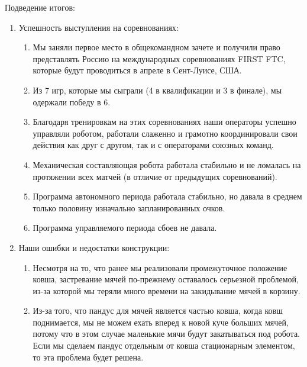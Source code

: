 Подведение итогов:
\begin{enumerate}
	\item Успешность выступления на соревнованиях:
	\begin{enumerate}
		\item Мы заняли первое место в общекомандном зачете и получили право представлять Россию на международных соревнованиях FIRST FTC, которые будут проводиться в апреле в Сент-Луисе, США.
		
		\item Из 7 игр, которые мы сыграли (4 в квалификации и 3 в финале), мы одержали победу в 6.
		
		\item Благодаря тренировкам на этих соревнованиях наши операторы успешно управляли роботом, работали слаженно и грамотно координировали свои действия как друг с другом, так и с операторами союзных команд.
		
		\item Механическая составляющая робота работала стабильно и не ломалась на протяжении всех матчей (в отличие от предыдущих соревнований).
		
		\item Программа автономного периода работала стабильно, но давала в среднем только половину изначально запланированных очков.
		
		\item Программа управляемого периода сбоев не давала.
		
	\end{enumerate}
	
	\item Наши ошибки и недостатки конструкции:
	\begin{enumerate}
		\item Несмотря на то, что ранее мы реализовали промежуточное положение ковша, застревание мячей по-прежнему оставалось серьезной проблемой, из-за которой мы теряли много времени на закидывание мячей в корзину.
		
		\item Из-за того, что пандус для мячей является частью ковша, когда ковш поднимается, мы не можем ехать вперед к новой куче больших мячей, потому что в этом случае маленькие мячи будут закатываться под робота. Если мы сделаем пандус отдельным от ковша стационарным элементом, то эта проблема будет решена.
		
	\end{enumerate}
	

\end{enumerate}

